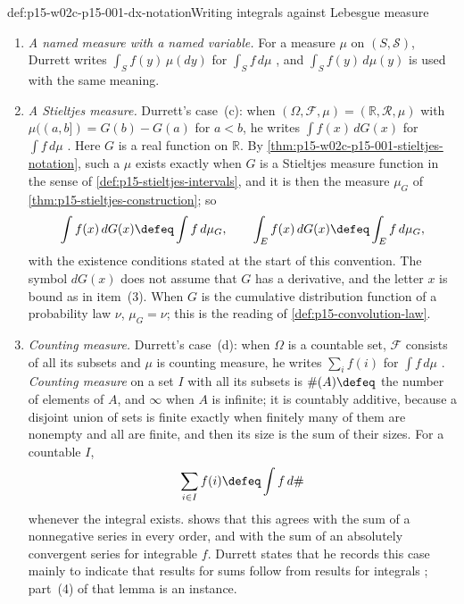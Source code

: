 \begin{hbconvention}{def:p15-w02c-p15-001-dx-notation}{Writing integrals against Lebesgue measure}
\begin{enumerate}
      \cref{def:p15-product-events}; the section is Borel by
      \cref{thm:p15-product-sections}. This is how the formula for
      \(m(y)\) in \cref{thm:p15-conditional-density-formulas} reads.
\item \emph{A named measure with a
      named variable.} For a measure \(\mu\) on \((S,\mathcal S)\),
      Durrett writes \(\int_S f(y)\,\mu(dy)\) for \(\int_S f\,d\mu\)
      \cite[thm.~1.6.9, p.~32]{DurrettPTEAuthor2019}, and
      \(\int_S f(y)\,d\mu(y)\) is used with the same meaning.
\item \emph{A Stieltjes measure.} Durrett's case~(c): when
      \((\Omega,\mathcal F,\mu)=(\mathbb R,\mathcal R,\mu)\) with
      \(\mu((a,b])=G(b)-G(a)\) for \(a<b\), he writes
      \(\int f(x)\,dG(x)\) for \(\int f\,d\mu\)
      \cite[sec.~1.4, p.~23]{DurrettPTEAuthor2019}. Here \(G\) is a
      real function on \(\mathbb R\). By
      \cref{thm:p15-w02c-p15-001-stieltjes-notation}, such a \(\mu\)
      exists exactly when \(G\) is a Stieltjes measure function in the
      sense of \cref{def:p15-stieltjes-intervals}, and it is then the
      measure \(\mu_G\) of \cref{thm:p15-stieltjes-construction}; so
      \[
       \int f(x)\,dG(x)\defeq\int f\,d\mu_G ,\qquad
       \int_E f(x)\,dG(x)\defeq\int_E f\,d\mu_G ,
      \]
      with the existence conditions stated at the start of this
      convention. The symbol \(dG(x)\) does not assume that \(G\) has a
      derivative, and the letter \(x\) is bound as in item~(3). When
      \(G\) is the cumulative distribution function of a probability law
      \(\nu\), \(\mu_G=\nu\); this is the reading of
      \cref{def:p15-convolution-law}.
\item \emph{Counting measure.} Durrett's case~(d): when \(\Omega\) is a
      countable set, \(\mathcal F\) consists of all its subsets and
      \(\mu\) is counting measure, he writes \(\sum_i f(i)\) for
      \(\int f\,d\mu\) \cite[sec.~1.4, p.~24]{DurrettPTEAuthor2019}.
      \emph{Counting measure} on a set \(I\) with all its subsets is
      \(\#(A)\defeq\) the number of elements of \(A\), and \(\infty\) when
      \(A\) is infinite; it is countably additive, because a disjoint
      union of sets is finite exactly when finitely many of them are
      nonempty and all are finite, and then its size is the sum of their
      sizes. For a countable \(I\),
      \[
       \sum_{i\in I}f(i)\defeq\int f\,d\#
      \]
      whenever the integral exists.
       shows that this agrees
      with the sum of a nonnegative series in every order, and with the
      sum of an absolutely convergent series for integrable \(f\). Durrett
      states that he records this case mainly to indicate that results
      for sums follow from results for integrals
      \cite[sec.~1.4, p.~24]{DurrettPTEAuthor2019}; part~(4) of that
      lemma is an instance.
\end{enumerate}
\end{hbconvention}

